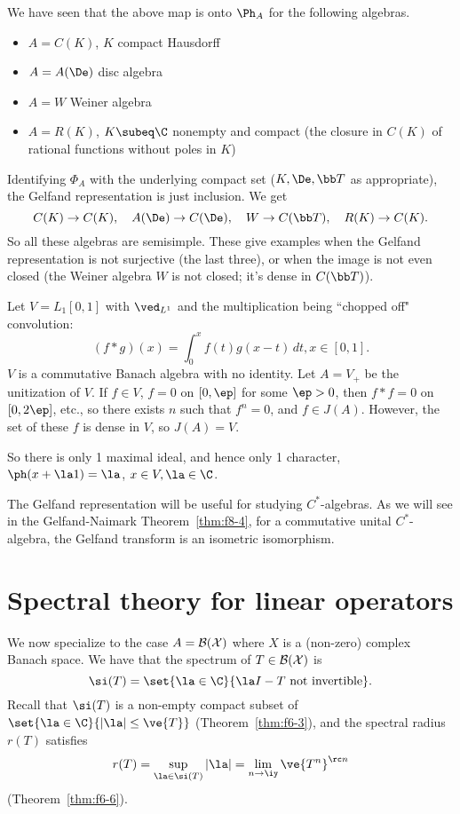 \begin{ex}
We have seen that the above map is onto $\Ph_A$ for the following algebras. 
\begin{itemize}
\item
$A=C(K)$, $K$ compact Hausdorff
\item
$A=A(\De)$ disc algebra
\item
$A=W$ Weiner algebra
\item 
$A=R(K)$, $K\subeq \C$ nonempty and compact
(the closure in $C(K)$ of rational functions without poles in $K$)
\end{itemize}
\end{ex}
Identifying $\Phi_A$ with the underlying compact set ($K,\De, \bb T$ as appropriate), the Gelfand representation is just inclusion.
We get
\[
C(K)\to C(K),\quad A(\De)\to C(\De), \quad W\to C(\bb T),\quad R(K)\to C(K).
\]
So all these algebras are semisimple. 
These give examples when the Gelfand representation is not surjective (the last three), or when the image is not even closed (the Weiner algebra $W$ is not closed; it's dense in $C(\bb T)$). 
\begin{ex}
Let $V=L_1[0,1]$ with $\ved_{L^1}$ and the multiplication being ``chopped off" convolution:
\[
(f*g)(x)=\int_0^xf(t)g(x-t)\,dt,x\in [0,1].
\]
$V$ is a commutative Banach algebra with no identity. Let $A=V_+$ be the unitization of $V$. If $f\in V$, $f=0$ on $[0,\ep]$ for some $\ep>0$, then $f*f=0$ on $[0,2\ep]$, etc., so there exists $n$ such that $f^n=0$, and $f\in J(A)$. However, the set of these $f$ is dense in $V$, so $J(A)=V$. 

So there is only 1 maximal ideal, and hence only 1 character, $\ph(x+\la 1)=\la$, $x\in V,\la \in \C$.
\end{ex}
The Gelfand representation will be useful for studying $C^*$-algebras. As we will see in the Gelfand-Naimark Theorem~\ref{thm:f8-4}, for a commutative unital $C^*$-algebra, the Gelfand transform is an isometric isomorphism.


\section{Spectral theory for linear operators}
We now specialize to the case $A=\cal B(X)$ where $X$ is a (non-zero) complex Banach space. We have that the spectrum of $T\in \cal B(X)$ is
\[
\si(T)=\set{\la\in \C}{\la I-T\text{ not invertible}}.
\]
Recall that $\si(T)$ is a non-empty compact subset of $\set{\la\in \C}{|\la|\le \ve{T}}$ (Theorem~\ref{thm:f6-3}), and the spectral radius $r(T)$ satisfies 
\[
r(T)=\sup_{\la\in \si(T)}|\la|=\lim_{n\to \iy} \ve{T^n}^{\rc n}
\]
(Theorem~\ref{thm:f6-6}).

